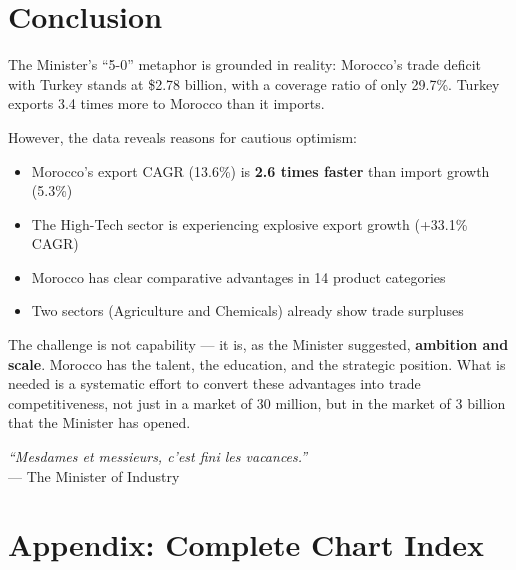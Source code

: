 \documentclass[12pt,a4paper]{article}
\begin{document}
\section{Conclusion}

The Minister's ``5-0'' metaphor is grounded in reality: Morocco's trade deficit with Turkey stands at \$2.78 billion, with a coverage ratio of only 29.7\%. Turkey exports 3.4 times more to Morocco than it imports.

However, the data reveals reasons for cautious optimism:

\begin{itemize}
\item Morocco's export CAGR (13.6\%) is \textbf{2.6 times faster} than import growth (5.3\%)
\item The High-Tech sector is experiencing explosive export growth (+33.1\% CAGR)
\item Morocco has clear comparative advantages in 14 product categories
\item Two sectors (Agriculture and Chemicals) already show trade surpluses
\end{itemize}

The challenge is not capability --- it is, as the Minister suggested, \textbf{ambition and scale}. Morocco has the talent, the education, and the strategic position. What is needed is a systematic effort to convert these advantages into trade competitiveness, not just in a market of 30 million, but in the market of 3 billion that the Minister has opened.

\vspace{1cm}
\begin{center}
\textit{``Mesdames et messieurs, c'est fini les vacances.''}\\
--- The Minister of Industry
\end{center}

\newpage
\appendix
\section{Appendix: Complete Chart Index}
\end{document}
